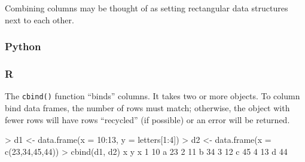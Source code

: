 \documentclass[
]{book}
\newenvironment{Shaded}{\begin{snugshade}}{\end{snugshade}}
\newcommand{\AttributeTok}[1]{\textcolor[rgb]{0.77,0.63,0.00}{#1}}
\newcommand{\DecValTok}[1]{\textcolor[rgb]{0.00,0.00,0.81}{#1}}
\newcommand{\FunctionTok}[1]{\textcolor[rgb]{0.00,0.00,0.00}{#1}}
\newcommand{\NormalTok}[1]{#1}
\newcommand{\OtherTok}[1]{\textcolor[rgb]{0.56,0.35,0.01}{#1}}
\newcommand{\SpecialCharTok}[1]{\textcolor[rgb]{0.00,0.00,0.00}{#1}}
\begin{document}
Combining columns may be thought of as setting rectangular data structures next to each other.

\hypertarget{python-29}{%
\subsubsection*{Python}\label{python-29}}

\hypertarget{r-29}{%
\subsubsection*{R}\label{r-29}}

The \texttt{cbind()} function ``binds'' columns. It takes two or more objects. To column bind data frames, the number of rows must match; otherwise, the object with fewer rows will have rows ``recycled'' (if possible) or an error will be returned.

\begin{Shaded}
\begin{Highlighting}[]
\SpecialCharTok{\textgreater{}}\NormalTok{ d1 }\OtherTok{\textless{}{-}} \FunctionTok{data.frame}\NormalTok{(}\AttributeTok{x =} \DecValTok{10}\SpecialCharTok{:}\DecValTok{13}\NormalTok{, }\AttributeTok{y =}\NormalTok{ letters[}\DecValTok{1}\SpecialCharTok{:}\DecValTok{4}\NormalTok{])}
\SpecialCharTok{\textgreater{}}\NormalTok{ d2 }\OtherTok{\textless{}{-}} \FunctionTok{data.frame}\NormalTok{(}\AttributeTok{x =} \FunctionTok{c}\NormalTok{(}\DecValTok{23}\NormalTok{,}\DecValTok{34}\NormalTok{,}\DecValTok{45}\NormalTok{,}\DecValTok{44}\NormalTok{))}
\SpecialCharTok{\textgreater{}} \FunctionTok{cbind}\NormalTok{(d1, d2)}
\NormalTok{   x y  x}
\DecValTok{1} \DecValTok{10}\NormalTok{ a }\DecValTok{23}
\DecValTok{2} \DecValTok{11}\NormalTok{ b }\DecValTok{34}
\DecValTok{3} \DecValTok{12}\NormalTok{ c }\DecValTok{45}
\DecValTok{4} \DecValTok{13}\NormalTok{ d }\DecValTok{44}
\end{Highlighting}
\end{Shaded}
\end{document}
